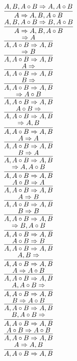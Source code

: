 \documentclass[11pt]{article}
\begin{document}
\begin{center}
\bigskip
\\$\infer{A\Rightarrow A, B, A\circ B}{A, B, A\circ B\Rightarrow A, A\circ B}$
\bigskip
\\$\infer{A\Rightarrow A, B, A\circ B}{A, B, A\circ B\Rightarrow B, A\circ B}$
\bigskip
\\$\infer{A, A\circ B\Rightarrow A, B}{\Rightarrow A}$
\bigskip
\\$\infer{A, A\circ B\Rightarrow A, B}{\Rightarrow B}$
\bigskip
\\$\infer{A, A\circ B\Rightarrow A, B}{A\Rightarrow }$
\bigskip
\\$\infer{A, A\circ B\Rightarrow A, B}{B\Rightarrow }$
\bigskip
\\$\infer{A, A\circ B\Rightarrow A, B}{\Rightarrow A\circ B}$
\bigskip
\\$\infer{A, A\circ B\Rightarrow A, B}{A\circ B\Rightarrow }$
\bigskip
\\$\infer{A, A\circ B\Rightarrow A, B}{\Rightarrow A, B}$
\bigskip
\\$\infer{A, A\circ B\Rightarrow A, B}{A\Rightarrow A}$
\bigskip
\\$\infer{A, A\circ B\Rightarrow A, B}{B\Rightarrow A}$
\bigskip
\\$\infer{A, A\circ B\Rightarrow A, B}{\Rightarrow A, A\circ B}$
\bigskip
\\$\infer{A, A\circ B\Rightarrow A, B}{A\circ B\Rightarrow A}$
\bigskip
\\$\infer{A, A\circ B\Rightarrow A, B}{A\Rightarrow B}$
\bigskip
\\$\infer{A, A\circ B\Rightarrow A, B}{B\Rightarrow B}$
\bigskip
\\$\infer{A, A\circ B\Rightarrow A, B}{\Rightarrow B, A\circ B}$
\bigskip
\\$\infer{A, A\circ B\Rightarrow A, B}{A\circ B\Rightarrow B}$
\bigskip
\\$\infer{A, A\circ B\Rightarrow A, B}{A, B\Rightarrow }$
\bigskip
\\$\infer{A, A\circ B\Rightarrow A, B}{A\Rightarrow A\circ B}$
\bigskip
\\$\infer{A, A\circ B\Rightarrow A, B}{A, A\circ B\Rightarrow }$
\bigskip
\\$\infer{A, A\circ B\Rightarrow A, B}{B\Rightarrow A\circ B}$
\bigskip
\\$\infer{A, A\circ B\Rightarrow A, B}{B, A\circ B\Rightarrow }$
\bigskip
\\$\infer{A, A\circ B\Rightarrow A, B}{A\circ B\Rightarrow A\circ B}$
\bigskip
\\$\infer{A, A\circ B\Rightarrow A, B}{A\Rightarrow A, B}$

\end{center}
\end{document}

